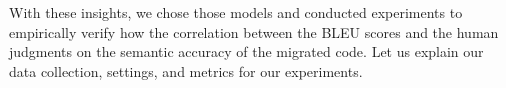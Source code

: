 

With these insights, we chose those models and conducted experiments
to empirically verify how the correlation between the BLEU scores and
the human judgments on the semantic accuracy of the migrated code. Let
us explain our data collection, settings, and metrics for our
experiments.
